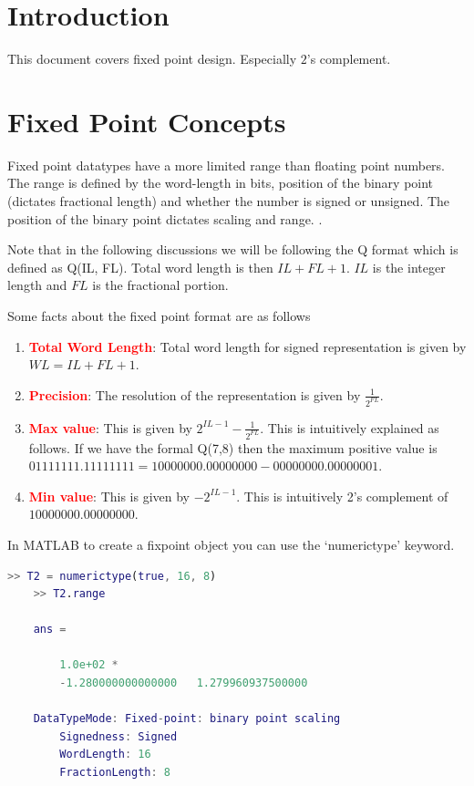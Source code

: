 
\section{Introduction}

This document covers fixed point design. Especially $2$'s complement. 

\section{Fixed Point Concepts}

Fixed point datatypes have a more limited range than floating point numbers. The range is defined by the word-length in bits, position of the binary point (dictates fractional length) and whether the number is signed or unsigned. The position of the binary point dictates scaling and range. \cite{matlab_fxp}.

Note that in the following discussions we will be following the Q format which is defined as Q(IL, FL). Total word length is then $IL + FL + 1$. $IL$ is the integer length and $FL$ is the fractional portion.

Some facts about the fixed point format are as follows
\begin{enumerate}
	\item \textcolor{red}{\textbf{Total Word Length}}: Total word length for signed representation is given by $WL = IL + FL + 1$.
	\item \textcolor{red}{\textbf{Precision}}: The resolution of the representation is given by $\frac{1}{2^{FL}}$.
	\item \textcolor{red}{\textbf{Max value}}: This is given by $2^{IL-1} - \frac{1}{2^{FL}}$. This is intuitively explained as follows. If we have the formal Q(7,8) then the maximum positive value is $01111111.11111111 = 10000000.00000000 - 00000000.00000001$.
	\item \textcolor{red}{\textbf{Min value}}: This is given by $-2^{IL-1}$. This is intuitively 2's complement of $10000000.00000000$.
\end{enumerate}

In MATLAB to create a fixpoint object you can use the `numerictype' keyword.

\begin{lstlisting}[language=matlab]
	>> T2 = numerictype(true, 16, 8)
	>> T2.range

	ans = 

   		1.0e+02 *
  		-1.280000000000000   1.279960937500000

   	DataTypeMode: Fixed-point: binary point scaling
    	Signedness: Signed
        WordLength: 16
        FractionLength: 8
\end{lstlisting}


